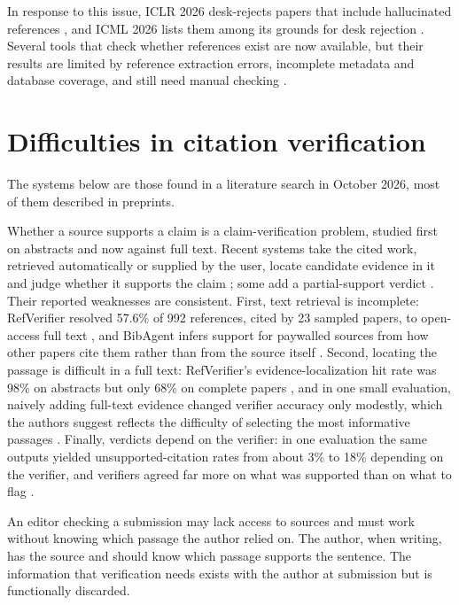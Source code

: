 \documentclass[11pt]{article}
\begin{document}
In response to this issue, ICLR 2026 desk-rejects papers that include hallucinated references \citep{iclr2026response}, and ICML 2026 lists them among its grounds for desk rejection \citep{icml2026ethics}. Several tools that check whether references exist are now available, but their results are limited by reference extraction errors, incomplete metadata and database coverage, and still need manual checking \citep{badalova2026hallucinated}.

\section{Difficulties in citation verification}

The systems below are those found in a literature search in October 2026, most of them described in preprints.

Whether a source supports a claim is a claim-verification problem, studied first on abstracts \citep{wadden2020scifact} and now against full text. Recent systems take the cited work, retrieved automatically or supplied by the user, locate candidate evidence in it and judge whether it supports the claim \citep{haan2025semanticcite,mocan2026refverifier,sadeghi2026deepsciverify,lee2026reflens,li2026bibagent}; some add a partial-support verdict \citep{haan2025semanticcite,mocan2026refverifier}. Their reported weaknesses are consistent. First, text retrieval is incomplete: RefVerifier resolved 57.6\% of 992 references, cited by 23 sampled papers, to open-access full text \citep{mocan2026refverifier}, and BibAgent infers support for paywalled sources from how other papers cite them rather than from the source itself \citep{li2026bibagent}. Second, locating the passage is difficult in a full text: RefVerifier's evidence-localization hit rate was 98\% on abstracts but only 68\% on complete papers \citep{mocan2026refverifier}, and in one small evaluation, naively adding full-text evidence changed verifier accuracy only modestly, which the authors suggest reflects the difficulty of selecting the most informative passages \citep{sadeghi2026deepsciverify}. Finally, verdicts depend on the verifier: in one evaluation the same outputs yielded unsupported-citation rates from about 3\% to 18\% depending on the verifier, and verifiers agreed far more on what was supported than on what to flag \citep{goo2026citefaithfulness}.

An editor checking a submission may lack access to sources and must work without knowing which passage the author relied on. The author, when writing, has the source and should know which passage supports the sentence. The information that verification needs exists with the author at submission but is functionally discarded.
\end{document}

